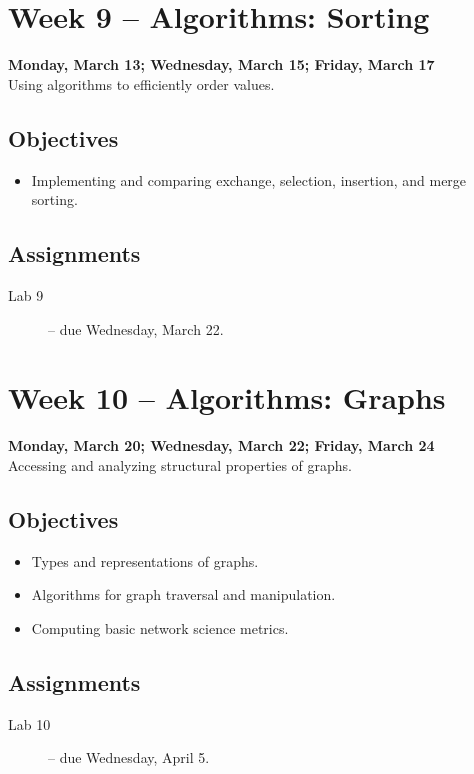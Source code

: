 \documentclass[10pt]{memoir}
\begin{document}
\section{Week 9 -- Algorithms: Sorting}
\textcolor{CUGold}{\textbf{Monday, March 13; Wednesday, March 15; Friday, March 17}}\\
Using algorithms to efficiently order values.

    \subsection{Objectives}
    \begin{itemize}
        \item Implementing and comparing exchange, selection, insertion, and merge sorting.
    \end{itemize}

    \subsection{Assignments}
    \begin{description}
        \item[Lab 9 ] -- due Wednesday, March 22.
    \end{description}
    
\section{Week 10 -- Algorithms: Graphs}
\textcolor{CUGold}{\textbf{Monday, March 20; Wednesday, March 22; Friday, March 24}}\\
Accessing and analyzing structural properties of graphs.

    \subsection{Objectives}
    \begin{itemize}
        \item Types and representations of graphs.
        \item Algorithms for graph traversal and manipulation.
        \item Computing basic network science metrics.
    \end{itemize}

    \subsection{Assignments}
    \begin{description}
        \item[Lab 10 ] -- due Wednesday, April 5.
    \end{description}
    
\end{document}
